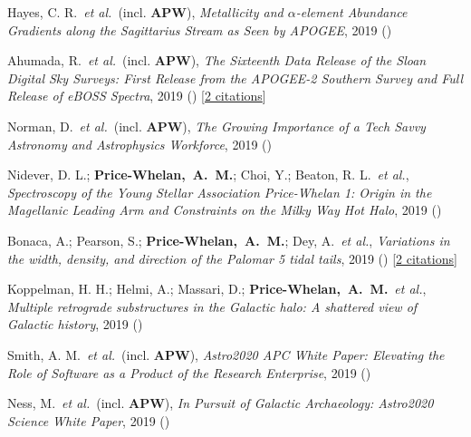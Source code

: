 \item[{\color{deemph}\scriptsize14}]Hayes, C. R.~\textit{et al.}~(incl. \textbf{APW}), \textit{Metallicity and $\alpha$-element Abundance Gradients along the Sagittarius Stream as Seen by APOGEE}, 2019 ()

\item[{\color{deemph}\scriptsize13}]Ahumada, R.~\textit{et al.}~(incl. \textbf{APW}), \textit{The Sixteenth Data Release of the Sloan Digital Sky Surveys: First Release from the APOGEE-2 Southern Survey and Full Release of eBOSS Spectra}, 2019 () [\href{http://adsabs.harvard.edu/abs/2019arXiv191202905A}{2 citations}]

\item[{\color{deemph}\scriptsize12}]Norman, D.~\textit{et al.}~(incl. \textbf{APW}), \textit{The Growing Importance of a Tech Savvy Astronomy and Astrophysics Workforce}, 2019 ()

\item[{\color{deemph}\scriptsize11}]Nidever, D. L.; \textbf{Price-Whelan,~A.~M.}; Choi, Y.; Beaton, R. L.~\textit{et al.}, \textit{Spectroscopy of the Young Stellar Association Price-Whelan 1: Origin in the Magellanic Leading Arm and Constraints on the Milky Way Hot Halo}, 2019 ()

\item[{\color{deemph}\scriptsize10}]Bonaca, A.; Pearson, S.; \textbf{Price-Whelan,~A.~M.}; Dey, A.~\textit{et al.}, \textit{Variations in the width, density, and direction of the Palomar 5 tidal tails}, 2019 () [\href{http://adsabs.harvard.edu/abs/2019arXiv191000592B}{2 citations}]

\item[{\color{deemph}\scriptsize9}]Koppelman, H. H.; Helmi, A.; Massari, D.; \textbf{Price-Whelan,~A.~M.}~\textit{et al.}, \textit{Multiple retrograde substructures in the Galactic halo: A shattered view of Galactic history}, 2019 ()

\item[{\color{deemph}\scriptsize8}]Smith, A. M.~\textit{et al.}~(incl. \textbf{APW}), \textit{Astro2020 APC White Paper: Elevating the Role of Software as a Product of the Research Enterprise}, 2019 ()

\item[{\color{deemph}\scriptsize7}]Ness, M.~\textit{et al.}~(incl. \textbf{APW}), \textit{In Pursuit of Galactic Archaeology: Astro2020 Science White Paper}, 2019 ()

